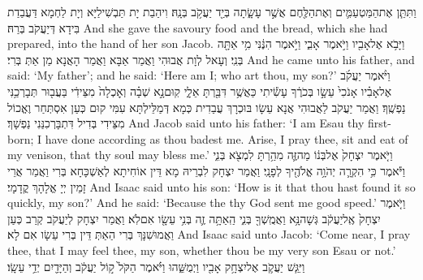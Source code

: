 {וַתִּתֵּ֧ן אֶת\maqqaf הַמַּטְעַמִּ֛ים וְאֶת\maqqaf הַלֶּ֖חֶם אֲשֶׁ֣ר עָשָׂ֑תָה בְּיַ֖ד יַעֲקֹ֥ב בְּנָֽהּ׃}
{וִיהַבַת יָת תַּבְשִׁילַיָּא וְיָת לַחְמָא דַּעֲבַדַת בִּידָא דְּיַעֲקֹב בְּרַהּ׃}
{And she gave the savoury food and the bread, which she had prepared, into the hand of her son Jacob.}{}
{וַיָּבֹ֥א אֶל\maqqaf אָבִ֖יו וַיֹּ֣אמֶר אָבִ֑י וַיֹּ֣אמֶר הִנֶּ֔נִּי מִ֥י אַתָּ֖ה בְּנִֽי׃}
{וְעָאל לְוָת אֲבוּהִי וַאֲמַר אַבָּא וַאֲמַר הָאֲנָא מַן אַתְּ בְּרִי׃}
{And he came unto his father, and said: ‘My father’; and he said: ‘Here am I; who art thou, my son?’}{}
{וַיֹּ֨אמֶר יַעֲקֹ֜ב אֶל\maqqaf אָבִ֗יו אָנֹכִי֙ עֵשָׂ֣ו בְּכֹרֶ֔ךָ עָשִׂ֕יתִי כַּאֲשֶׁ֥ר דִּבַּ֖רְתָּ אֵלָ֑י קֽוּם\maqqaf נָ֣א שְׁבָ֗ה וְאׇכְלָה֙ מִצֵּידִ֔י בַּעֲב֖וּר תְּבָרְכַ֥נִּי נַפְשֶֽׁךָ׃}
{וַאֲמַר יַעֲקֹב לַאֲבוּהִי אֲנָא עֵשָׂו בּוּכְרָךְ עֲבַדִית כְּמָא דְּמַלֵּילְתָּא עִמִּי קוּם כְּעַן אִסְתְּחַר וֶאֱכוֹל מִצֵּידִי בְּדִיל דִּתְבָּרְכִנַּנִי נַפְשָׁךְ׃}
{And Jacob said unto his father: ‘I am Esau thy first-born; I have done according as thou badest me. Arise, I pray thee, sit and eat of my venison, that thy soul may bless me.’}{}
{וַיֹּ֤אמֶר יִצְחָק֙ אֶל\maqqaf בְּנ֔וֹ מַה\maqqaf זֶּ֛ה מִהַ֥רְתָּ לִמְצֹ֖א בְּנִ֑י וַיֹּ֕אמֶר כִּ֥י הִקְרָ֛ה יְהֹוָ֥ה אֱלֹהֶ֖יךָ לְפָנָֽי׃}
{וַאֲמַר יִצְחָק לִבְרֵיהּ מָא דֵּין אוֹחִיתָא לְאַשְׁכָּחָא בְּרִי וַאֲמַר אֲרֵי זָמֵין יְיָ אֱלָהָךְ קֳדָמָי׃}
{And Isaac said unto his son: ‘How is it that thou hast found it so quickly, my son?’ And he said: ‘Because the \lord\space thy God sent me good speed.’}{}
{וַיֹּ֤אמֶר יִצְחָק֙ אֶֽל\maqqaf יַעֲקֹ֔ב גְּשָׁה\maqqaf נָּ֥א וַאֲמֻֽשְׁךָ֖ בְּנִ֑י הַֽאַתָּ֥ה זֶ֛ה בְּנִ֥י עֵשָׂ֖ו אִם\maqqaf לֹֽא׃}
{וַאֲמַר יִצְחָק לְיַעֲקֹב קְרַב כְּעַן וַאֲמוּשִׁנָּךְ בְּרִי הַאַתְּ דֵּין בְּרִי עֵשָׂו אִם לָא׃}
{And Isaac said unto Jacob: ‘Come near, I pray thee, that I may feel thee, my son, whether thou be my very son Esau or not.’}{}
{וַיִּגַּ֧שׁ יַעֲקֹ֛ב אֶל\maqqaf יִצְחָ֥ק אָבִ֖יו וַיְמֻשֵּׁ֑הוּ וַיֹּ֗אמֶר הַקֹּל֙ ק֣וֹל יַעֲקֹ֔ב וְהַיָּדַ֖יִם יְדֵ֥י עֵשָֽׂו׃}
